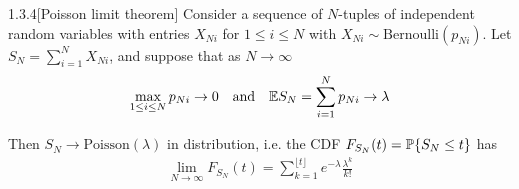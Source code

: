 \begin{thm}{1.3.4}[Poisson limit theorem]
Consider a sequence of $N$-tuples of independent random variables with entries $X_{Ni}$ for $1 \leq i \leq N$ with $X_{Ni} \sim \text{Bernoulli}(p_{Ni})$. Let $S_N = \sum_{i=1}^N X_{Ni}$, and suppose that as $N\to\infty$
\begin{align*}
    \max_{1 \leq i \leq N} p_{Ni} \to 0 \quad\text{and}\quad \E S_N = \sum_{i=1}^N p_{Ni}\to \lambda
\end{align*}

Then $S_N \to \text{Poisson}(\lambda)$ in distribution, i.e. the CDF $F_{S_N}(t) = \P \{S_N \leq t\}$ has
\begin{align*}
    \lim_{N\to\infty} F_{S_N}(t) = \sum_{k=1}^{\lfloor t \rfloor} e^{-\lambda} \frac {\lambda^k} {k!}
\end{align*}
\end{thm}